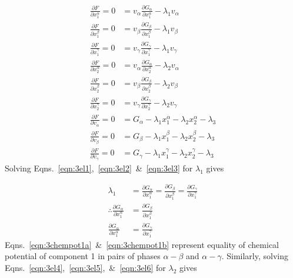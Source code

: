 \documentclass[10pt]{article}
\begin{document}
\begin{align}
  \label{eqn:3el1}
  \frac{\partial F}{\partial x_1^{\alpha}} = 0
  &= v_{\alpha} \frac{\partial G_{\alpha}}{\partial x_1^{\alpha}} - \lambda_1 v_{\alpha}\\
  \label{eqn:3el2}
  \frac{\partial F}{\partial x_1^{\beta}} = 0
  &= v_{\beta} \frac{\partial G_{\beta}}{\partial x_1^{\beta}} - \lambda_1 v_{\beta}\\
  \label{eqn:3el3}
  \frac{\partial F}{\partial x_1^{\gamma}} = 0
  &= v_{\gamma} \frac{\partial G_{\gamma}}{\partial x_1^{\gamma}} - \lambda_1 v_{\gamma}\\
  \label{eqn:3el4}
  \frac{\partial F}{\partial x_2^{\alpha}} = 0
  &= v_{\alpha} \frac{\partial G_{\alpha}}{\partial x_2^{\alpha}} - \lambda_2 v_{\alpha}\\
  \label{eqn:3el5}
  \frac{\partial F}{\partial x_2^{\beta}} = 0
  &= v_{\beta} \frac{\partial G_{\beta}}{\partial x_2^{\beta}} - \lambda_2 v_{\beta}\\
  \label{eqn:3el6}
  \frac{\partial F}{\partial x_2^{\gamma}} = 0
  &= v_{\gamma} \frac{\partial G_{\gamma}}{\partial x_2^{\gamma}} - \lambda_2 v_{\gamma}\\
  \label{eqn:3el7}
  \frac{\partial F}{\partial v_{\alpha}} = 0
  &= G_{\alpha} - \lambda_1 x_1^{\alpha} - \lambda_2 x_2^{\alpha} - \lambda_3\\
  \label{eqn:3el8}
  \frac{\partial F}{\partial v_{\beta}} = 0
  &= G_{\beta} - \lambda_1 x_1^{\beta} - \lambda_2 x_2^{\beta} - \lambda_3\\
  \label{eqn:3el9}
  \frac{\partial F}{\partial v_{\gamma}} = 0
  &= G_{\gamma} - \lambda_1 x_1^{\gamma} - \lambda_2 x_2^{\gamma} - \lambda_3
\end{align}
Solving Eqns.~\ref{eqn:3el1},~\ref{eqn:3el2}~\&~\ref{eqn:3el3}
for $\lambda_1$ gives

\begin{align}
  \lambda_1 &= \frac{\partial G_{\alpha}}{\partial x_1^{\alpha}}
             = \frac{\partial G_{\beta}}{\partial x_1^{\beta}}
             = \frac{\partial G_{\gamma}}{\partial x_1^{\gamma}}\\
  \label{eqn:3chempot1a}
  \therefore \frac{\partial G_{\alpha}}{\partial x_1^{\alpha}}
          &= \frac{\partial G_{\beta}}{\partial x_1^{\beta}}\\
  \label{eqn:3chempot1b}
             \frac{\partial G_{\alpha}}{\partial x_1^{\alpha}}
          &= \frac{\partial G_{\gamma}}{\partial x_1^{\gamma}}
\end{align}
Eqns.~\ref{eqn:3chempot1a}~\&~\ref{eqn:3chempot1b} represent equality of
chemical potential of component 1 in pairs of phases $\alpha-\beta$ and
$\alpha-\gamma$. Similarly, solving
Eqns.~\ref{eqn:3el4},~\ref{eqn:3el5},~\&~\ref{eqn:3el6} for $\lambda_2$ gives
\end{document}
